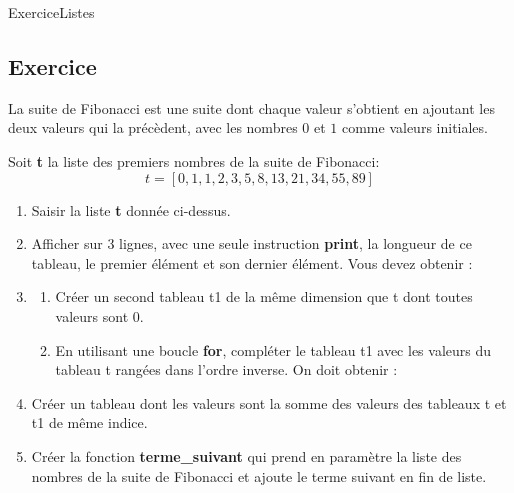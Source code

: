 \documentclass[11pt,a4paper]{article}
\newcounter{numexo}
\begin{document}
\begin{NSI}
{Exercice}{Listes}
\end{NSI}


\addtocounter{numexo}{1}
\subsection*{\Large Exercice \thenumexo}
La suite de Fibonacci est une suite dont chaque valeur s'obtient en ajoutant les deux valeurs qui la précèdent, avec les nombres $0$ et $1$ comme valeurs initiales.

Soit \textbf{t} la liste des premiers nombres de la suite de Fibonacci: $$t=[0,1,1,2,3,5,8,13,21,34,55,89]$$
\begin{enumerate}
\item Saisir la liste \textbf{t} donnée ci-dessus.
\item Afficher sur 3 lignes, avec une seule instruction \textbf{print}, la longueur de ce tableau, le premier élément et son dernier élément. Vous devez obtenir :

\begin{center}
\end{center}
\item \begin{enumerate}
\item Créer un second tableau t1 de la même dimension que t dont toutes valeurs sont 0.
\item En utilisant une boucle \textbf{for}, compléter le tableau t1 avec les valeurs du tableau t rangées dans l'ordre inverse. On doit obtenir :

\begin{center}
\fbox{\begin{minipage}{8cm}
[89,55,34,21,13,8,5,3,2,1,1,0]
\end{minipage}
}
\end{center}
\end{enumerate} 
\item Créer un tableau dont les valeurs sont la somme des valeurs des tableaux t et t1 de même indice.
\item Créer la fonction \textbf{terme\_suivant} qui prend en paramètre la liste des nombres de la suite de Fibonacci et ajoute le terme suivant en fin de liste.
\end{enumerate}
\end{document}

